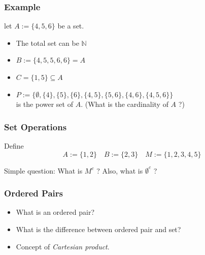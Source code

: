 \documentclass[12pt, t]{beamer}
\renewcommand{\emph}[1]{{\color{Turquoise3}\textsl{#1}}}
\begin{document}
\begin{frame}
    \frametitle{Example}
    let $A:= \{4,5,6\}$ be a set.
    \begin{itemize}
        \item The total set can be $\mathbb{N}$
        \item $B:= \{4,5,5,6,6\}=A$
        \item $C=\{1,5\}\subseteq A$
        \item $P:=\{\emptyset,\{4\},\{5\},\{6\},\{4,5\},\{5,6\},\{4,6\},\{4,5,6\}\}$
              \\\hspace{1em} is the power set of $A$. (What is the cardinality of $A$ ?)
    \end{itemize}
\end{frame}

\begin{frame}
    \frametitle{Set Operations}
    Define
    \begin{equation*}
        A:=\{1,2\} \quad B:=\{2,3\} \quad M:=\{1,2,3,4,5\}
    \end{equation*}
    \begin{table}
        \centering
    \end{table}

    \par Simple question:
    \center What is $M^c$ ? Also, what is $\emptyset^c$ ?
\end{frame}

\begin{frame}
    \frametitle{Ordered Pairs}
    \begin{itemize}
        \item What is an ordered pair?
        \item What is the difference between ordered pair and set?
        \item Concept of \emph{Cartesian product}.
    \end{itemize}
\end{frame}
\end{document}
